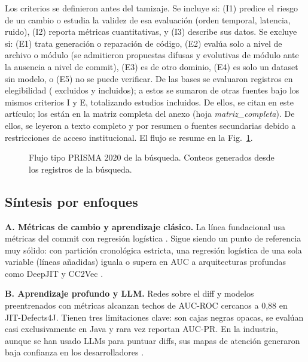 Los criterios se definieron antes del tamizaje. Se incluye si: (I1) predice el riesgo de un cambio o estudia la validez de esa evaluación (orden temporal, latencia, ruido), (I2) reporta métricas cuantitativas, y (I3) describe sus datos. Se excluye si: (E1) trata generación o reparación de código, (E2) evalúa solo a nivel de archivo o módulo (se admitieron propuestas difusas y evolutivas de módulo ante la ausencia a nivel de commit), (E3) es de otro dominio, (E4) es solo un dataset sin modelo, o (E5) no se puede verificar. De las bases se evaluaron \nPasan{} registros en elegibilidad (\nExclTexto{} excluidos y \nIncluidosBases{} incluidos); a estos se sumaron \nOtros{} de otras fuentes bajo los mismos criterios I y E, totalizando \nTotalIncluidos{} estudios incluidos. De ellos, \nIncluidosCitados{} se citan en este artículo; los \nTotalIncluidos{} están en la matriz completa del anexo (hoja \emph{matriz\_completa}). De ellos, \nTextoCompleto{} se leyeron a texto completo y \nSoloResumen{} por resumen o fuentes secundarias debido a restricciones de acceso institucional. El flujo se resume en la Fig.~\ref{fig:prisma}.

\begin{figure}[!t]
\centering

\caption{Flujo tipo PRISMA 2020 de la búsqueda. Conteos generados desde los registros de la búsqueda.}
\label{fig:prisma}
\end{figure}



\subsection{Síntesis por enfoques}

\textbf{A. Métricas de cambio y aprendizaje clásico.} La línea fundacional usa métricas del commit con regresión logística \cite{Mockus2000,Kamei2013}. Sigue siendo un punto de referencia muy sólido: con partición cronológica estricta, una regresión logística de una sola variable (líneas añadidas) iguala o supera en AUC a arquitecturas profundas como DeepJIT y CC2Vec \cite{Zeng2021}.

\textbf{B. Aprendizaje profundo y LLM.} Redes sobre el diff y modelos preentrenados con métricas \cite{Ni2022} alcanzan techos de AUC-ROC cercanos a 0,88 en JIT-Defects4J. Tienen tres limitaciones clave: son cajas negras opacas, se evalúan casi exclusivamente en Java y rara vez reportan AUC-PR. En la industria, aunque se han usado LLMs para puntuar diffs, sus mapas de atención generaron baja confianza en los desarrolladores \cite{Liu2026}.

